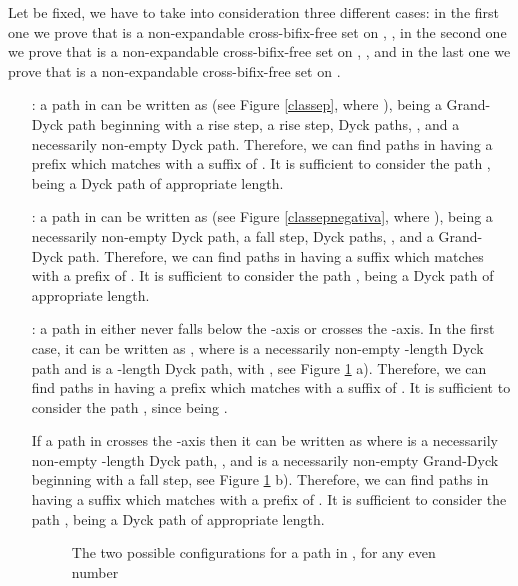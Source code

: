 \documentclass[a4paper,11pt]{article}
\newcommand{\cvd}{\hfill \bigskip}
\begin{document}
Let  be fixed, we have to take into consideration three
different cases: in the first one we prove that  is
a non-expandable cross-bifix-free set on ,
, in the second one we prove that  is a
non-expandable cross-bifix-free set on ,
, and in the last one we prove that  is a
non-expandable cross-bifix-free set on .

\begin{itemize}
\item[  :] a path  in 
can be written as  (see Figure \ref{classep}, where ), being 
a Grand-Dyck path beginning with a rise step,  a rise step,
 Dyck paths, , and  a
necessarily non-empty Dyck path. Therefore, we can find paths in
 having a prefix which matches with a suffix of
. It is sufficient to consider the path , being  a Dyck path of
appropriate length.

\item[  :] a path  in 
can be written as  (see
Figure \ref{classepnegativa}, where ), being  a
necessarily non-empty Dyck path,  a fall step,
 Dyck paths, , and  a
Grand-Dyck path. Therefore, we can find paths in 
having a suffix which matches with a prefix of . It is
sufficient to consider the path , being  a Dyck path of appropriate length.

\item[  :] a path  in  either never falls below the -axis or
crosses the -axis. In the first case, it can be written as
, where  is a
necessarily non-empty -length Dyck path and  is a
-length Dyck path, with ,
see Figure \ref{parparNE} a). Therefore, we can find paths in
 having a prefix which matches with a suffix of
. It is sufficient to consider the path , since  being .

If a path  in 
crosses the -axis then it can be written as  where  is a necessarily non-empty -length Dyck
path, , and  is a necessarily non-empty
Grand-Dyck beginning with a fall step, see Figure \ref{parparNE}
b). Therefore, we can find paths in  having a suffix
which matches with a prefix of . It is sufficient to
consider the path ,
being  a Dyck path of appropriate length.

\begin{figure}[!htb]
\begin{center}
 \caption{\small{The two
possible configurations for a path  in , for any even number }
\label{parparNE}}\vspace{-12pt}
\end{center}
\end{figure}
\end{itemize}
\cvd
\end{document}
